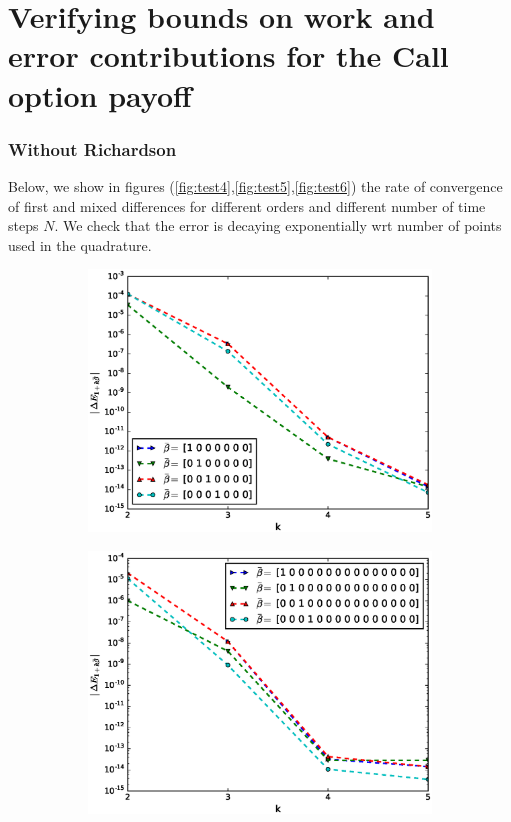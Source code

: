 \documentclass[11pt]{article}
\begin{document}
\section{Verifying bounds on work and error contributions for the Call option payoff}
\subsubsection*{Without Richardson}

Below, we show in figures (\eqref{fig:test4},\eqref{fig:test5},\eqref{fig:test6}) the rate of convergence of first and mixed differences for different orders and different number of time steps $N$. We check that the error is decaying exponentially wrt number of points used in the quadrature.


\begin{figure}[!h]
	\centering
	\begin{subfigure}{.5\textwidth}
		\centering
		\includegraphics[width=1\linewidth]{./figures/first_difference_1D_BS_N_8.eps}
		\caption{}
		\label{fig:sub41}
	\end{subfigure}%
	\begin{subfigure}{.5\textwidth}
		\centering
		\includegraphics[width=1\linewidth]{./figures/first_difference_1D_BS_N_16.eps}

\end{subfigure}
\end{figure}
\end{document}
